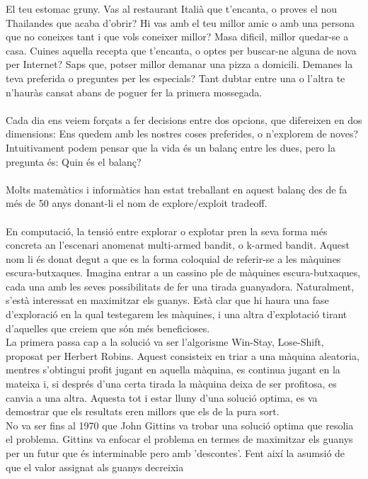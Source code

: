 
El teu estomac gruny. Vas al restaurant Italià que t'encanta, 
o proves el nou Thailandes que acaba d'obrir? Hi vas amb el 
teu millor amic o amb una persona que no coneixes tant i que 
vols coneixer millor? Masa dificil, millor quedar-se a casa. 
Cuines aquella recepta que t'encanta, o optes per buscar-ne 
alguna de nova per Internet? Saps que, potser millor demanar
una pizza a domicili. Demanes la teva preferida o preguntes 
per les especials? Tant dubtar entre una o l'altra te n'hauràs
cansat abans de poguer fer la primera mossegada.
\\\\
Cada dia ens veiem forçats a fer decisions entre dos opcions,
que difereixen en dos dimensions: Ens quedem amb les nostres
coses preferides, o n'explorem de noves? Intuitivament podem
pensar que la vida és un balanç entre les dues, pero la pregunta
és: Quin és el balanç?
\\\\
Molts matemàtics i informàtics han estat treballant en aquest
balanç des de fa més de 50 anys donant-li el nom de explore/exploit
tradeoff.
\\\\
En computació, la tensió entre explorar o explotar pren la seva 
forma més concreta an l'escenari anomenat multi-armed bandit, o
k-armed bandit. Aquest nom li és donat degut a que es la forma
coloquial de referir-se a les màquines escura-butxaques.
Imagina entrar a un cassino ple de màquines escura-butxaques,
cada una amb les seves possibilitats de fer una tirada guanyadora.
Naturalment, s'està interessat en maximitzar els guanys. Està clar
que hi haura una fase d'exploració en la qual testegarem les màquines,
i una altra d'explotació tirant d'aquelles que creiem que són més 
beneficioses.\\
La primera passa cap a la solució va ser l'algorisme Win-Stay, Lose-Shift,
proposat per Herbert Robins. Aquest consisteix en triar a una màquina 
aleatoria, mentres s'obtingui profit jugant en aquella màquina, es continua
jugant en la mateixa i, si després d'una certa tirada la màquina deixa de ser 
profitosa, es canvia a una altra. Aquesta tot i estar lluny d'una solució optima,
es va demostrar que els resultats eren millors que els de la pura sort.\\
No va ser fins al 1970 que John Gittins va trobar una solució optima que 
resolia el problema. Gittins va enfocar el problema en termes de maximitzar
els guanys per un futur que és interminable pero amb 'descontes'. 
Fent així la asumsió de que el valor assignat als guanys decreixia 

